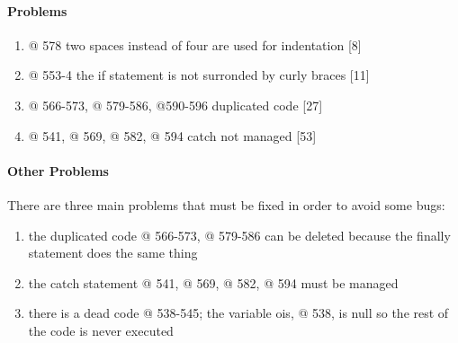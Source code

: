 \paragraph{Problems}
\begin{enumerate}
	\item @ 578 two spaces instead of four are used for indentation [8]
	\item @ 553-4 the if statement is not surronded by curly braces [11]
	\item @ 566-573, @ 579-586, @590-596 duplicated code [27]
	\item @ 541, @ 569, @ 582, @ 594 catch not managed [53]
\end{enumerate} 

\paragraph{Other Problems}

There are three main problems that must be fixed in order to avoid some bugs:

\begin{enumerate}
	\item the duplicated code  @ 566-573, @ 579-586 can be deleted because the finally statement does the same thing
	\item the catch statement @ 541, @ 569, @ 582, @ 594 must be managed
	\item there is a dead code @ 538-545; the variable ois, @ 538, is null so the rest of the code is never executed
\end{enumerate} 
